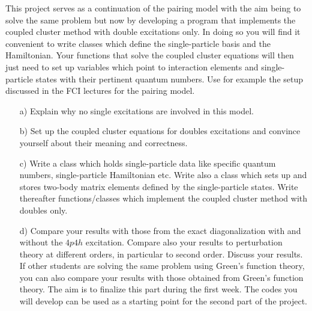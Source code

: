   \begin{prob}\label{problem:prob8.6}
  This project serves as a continuation of the pairing model with the
  aim being to solve the same problem but now by developing a program
  that implements the coupled cluster method with double excitations
  only. In doing so you will find it convenient to write classes which
  define the single-particle basis and the Hamiltonian. Your functions
  that solve the coupled cluster equations will then just need to set
  up variables which point to interaction elements and single-particle
  states with their pertinent quantum numbers. Use for example the
  setup discussed in the FCI lectures for the pairing model.

  \begin{enumerate}

  \item[a)] Explain why no single excitations are involved in this
    model.


  \item[b)] Set up the coupled cluster equations for doubles
    excitations and convince yourself about their meaning and
    correctness.

  \item[c)] Write a class which holds single-particle data like
    specific quantum numbers, single-particle Hamiltonian etc. Write
    also a class which sets up and stores two-body matrix elements
    defined by the single-particle states.  Write thereafter
    functions/classes which implement the coupled cluster method with
    doubles only.


  \item[d)] Compare your results with those from the exact
    diagonalization with and without the $4p4h$ excitation. Compare
    also your results to perturbation theory at different orders, in
    particular to second order. Discuss your results.  If other
    students are solving the same problem using Green's function
    theory, you can also compare your results with those obtained from
    Green's function theory. The aim is to finalize this part during
    the first week. The codes you will develop can be used as a
    starting point for the second part of the project.
  \end{enumerate}
  \end{prob}


